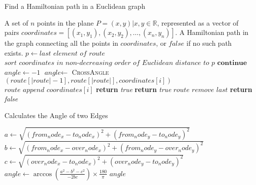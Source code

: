 \documentclass[a4paper,10pt,ngerman]{scrartcl}
\begin{document}
\begin{algorithm}
    \caption{Find a Hamiltonian path in a Euclidean graph}
    \begin{algorithmic}
        \Require A set of $n$ points in the plane $P={(x,y)| x,y \in \mathbb{R}}$, represented as a vector of pairs $\textit{coordinates}=[(x_1,y_1), (x_2,y_2),\dots, (x_n,y_n)]$.
        \Ensure A Hamiltonian path in the graph connecting all the points in $\textit{coordinates}$, or $\textit{false}$ if no such path exists.
                \State $p\gets \textit{last element of } \textit{route}$
                \State $\textit{sort } \textit{coordinates } \textit{in non-decreasing order of Euclidean distance to } p$
            \EndIf
                    \State $\textbf{continue}$
                \EndIf
                \State $\textit{angle}\gets -1$
                    \State $\textit{angle}\gets$ \textsc{CrossAngle}$(\textit{route}[|\textit{route}|-1], \textit{route}[|\textit{route}|], \textit{coordinates}[i])$
                \EndIf
                    \State $\textit{route append }\textit{coordinates}[i]$
                        \State \textbf{return} \textit{true}
                    \EndIf
                        \State \textbf{return} \textit{true}
                    \Else
                        \State $\textit{route remove last}$
                    \EndIf
                \EndIf
            \EndFor
            \State \textbf{return} \textit{false}
        \EndFunction
    \end{algorithmic}\label{alg:algorithm3}
\end{algorithm}

\begin{algorithm}
    \caption{Calculates the Angle of two Edges}
            \begin{algorithmic}
 \State $\textit{a}\gets \sqrt{(from_node_x - to_node_x)^2 + (from_node_y - to_node_y)^2}$
            \State $\textit{b}\gets \sqrt{(from_node_x - over_node_x)^2 + (from_node_y - over_node_y)^2}$
            \State $\textit{c}\gets \sqrt{(over_node_x - to_node_x)^2 + (over_node_y - to_node_y)^2}$
            \State $\textit{angle} \gets \arccos\left(\frac{a^2 - b^2 - c^2}{-2bc}\right) \times \frac{180}{\pi}$
            \State \Return $angle$
            \EndFunction
\end{algorithmic}\label{alg:algorithm2}
\end{algorithm}
\end{document}
